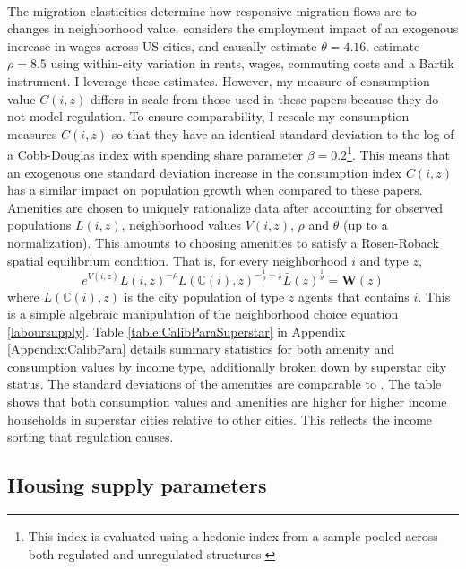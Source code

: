 \documentclass[12pt]{article}
\begin{document}
\paragraph*{}
The migration elasticities determine how responsive migration flows are to changes in neighborhood value. \cite{morettihornbeck} considers the employment impact of an exogenous increase in wages across US cities, and causally estimate $\theta = 4.16$. \cite{BSH} estimate $\rho = 8.5$ using within-city variation in rents, wages, commuting costs and a Bartik instrument. I leverage these estimates. However, my measure of consumption value $C(i, z)$ differs in scale from those used in these papers because they do not model regulation. To ensure comparability, I rescale my consumption measures $C(i, z)$ so that they have an identical standard deviation to the log of a Cobb-Douglas index with spending share parameter $\beta = 0.2$\footnote{This index is evaluated using a hedonic index from a sample pooled across both regulated and unregulated structures.}. This means that an exogenous one standard deviation increase in the consumption index $C(i, z)$ has a similar impact on population growth when compared to these papers. Amenities are chosen to uniquely rationalize data after accounting for observed populations $L(i, z)$, neighborhood values $V(i, z)$, $\rho$ and $\theta$ (up to a normalization). This amounts to choosing amenities to satisfy a Rosen-Roback spatial equilibrium condition. That is, for every neighborhood $i$ and type $z$,
\begin{equation}\label{RosenRobackCalibrate}
 e^{V(i, z)}L(i, z)^{-\rho}L(\mathbb{C}(i), z)^{-\frac{1}{\rho} + \frac{1}{\theta}}\bar{L}(z)^{\frac{1}{\theta}} = \boldsymbol{W}(z) 
\end{equation}
 where $L(\mathbb{C}(i), z)$ is the city population of type $z$ agents that contains $i$. This is a simple algebraic manipulation of the neighborhood choice equation \eqref{laboursupply}. Table \ref{table:CalibParaSuperstar} in Appendix \ref{Appendix:CalibPara} details summary statistics for both amenity and consumption values by income type, additionally broken down by superstar city status. The standard deviations of the amenities are comparable to \cite{hseihmoretti}.  The table shows that both consumption values and amenities are higher for higher income households in superstar cities relative to other cities. This reflects the income sorting that regulation causes.

\subsection{Housing supply parameters}
\end{document}
